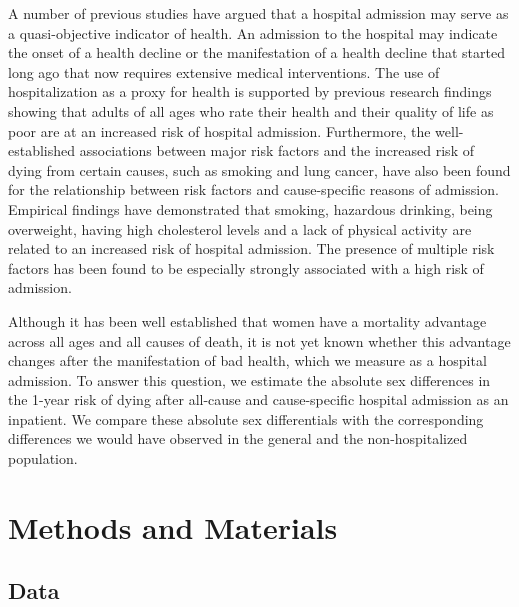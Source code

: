 A number of previous studies have argued that a hospital 
admission may serve as a quasi-objective indicator of health. 
An admission to the hospital may indicate the onset of a health 
decline or the manifestation of a health decline that started 
long ago that now requires extensive medical interventions.\citep{karampampa2013trends,
karampampa2014,case2005sex} The use of hospitalization as a 
proxy for health is supported by previous research findings 
showing that adults of all ages who rate their health and 
their quality of life as poor are at an increased risk of 
hospital admission.\citep{fleury2014predictors,farkas2010self,
desalvo2005predicting,kennedy2001repeated} Furthermore, 
the well-established associations between major risk factors 
and the increased risk of dying from certain causes, such 
as smoking and lung cancer, have also been found for the 
relationship between risk factors and cause-specific reasons 
of admission.\citep{hanlon2007analysis,hanlon2000link,hanlon1998hospital} 
Empirical findings have demonstrated that smoking,\citep{hanlon2007analysis} 
hazardous drinking,\citep{smyth2015alcohol} being overweight,\citep{reeves2014hospital} 
having high cholesterol levels\citep{crowe2013risk} and a 
lack of physical activity\citep{garcia2006regular} are related 
to an increased risk of hospital admission. The presence of 
multiple risk factors has been found to be especially strongly 
associated with a high risk of admission.\citep{syddall2016understanding}

Although it has been well established that women have a mortality 
advantage across all ages and all causes of death, it is not 
yet known whether this advantage changes after the manifestation 
of bad health, which we measure as a hospital admission. To answer 
this question, we estimate the absolute sex differences in the 
1-year risk of dying after all-cause and cause-specific hospital 
admission as an inpatient. We compare these absolute sex differentials 
with the corresponding differences we would have observed in 
the general and the non-hospitalized population.\\


\section{Methods and Materials}

\subsection{Data}

